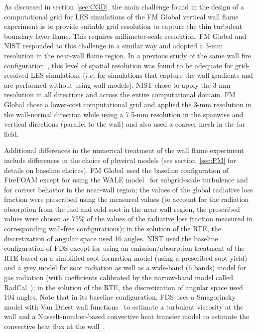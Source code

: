 As discussed in section~\ref{sec:CGD}, the main challenge found in the design of a computational grid for LES simulations of the FM Global vertical wall flame experiment is to provide suitable grid resolution to capture the thin turbulent boundary layer flame. This requires millimeter-scale resolution. FM Global and NIST responded to this challenge in a similar way and adopted a 3-mm resolution in the near-wall flame region. In a previous study of the same wall fire configuration~\cite{Ren:2016}, this level of spatial resolution was found to be adequate for grid-resolved LES simulations ($i.e.$ for simulations that capture the wall gradients and are performed without using wall models). NIST chose to apply the 3-mm resolution in all directions and across the entire computational domain. FM Global chose a lower-cost computational grid and applied the 3-mm resolution in the wall-normal direction while using a 7.5-mm resolution in the spanwise and vertical directions (parallel to the wall) and also used a coarser mesh in the far field.

Additional differences in the numerical treatment of the wall flame experiment include differences in the choice of physical models (see section~\ref{sec:PM} for details on baseline choices). FM Global used the baseline configuration of FireFOAM except for using the WALE model~\cite{Ducros:1999} for subgrid-scale turbulence and for correct behavior in the near-wall region; the values of the global radiative loss fraction were prescribed using the measured values (to account for the radiation absorption from the fuel and cold soot in the near wall region, the prescribed values were chosen as 75\% of the values of the radiative loss fraction measured in corresponding wall-free configurations); in the solution of the RTE, the discretization of angular space used 16 angles. NIST used the baseline configuration of FDS except for using an emission/absorption treatment of the RTE based on a simplified soot formation model (using a prescribed soot yield) and a grey model for soot radiation as well as a wide-band (6 bands) model for gas radiation (with coefficients calibrated by the narrow-band model called RadCal~\cite{RadCal}); in the solution of the RTE, the discretization of angular space used 104 angles. Note that in its baseline configuration, FDS uses a Smagorinsky model with Van Driest wall functions~\cite{FDS_Math_Guide} to estimate a turbulent viscosity at the wall and a Nusselt-number-based convective heat transfer model to estimate the convective heat flux at the wall~\cite{FDS_Math_Guide}.

